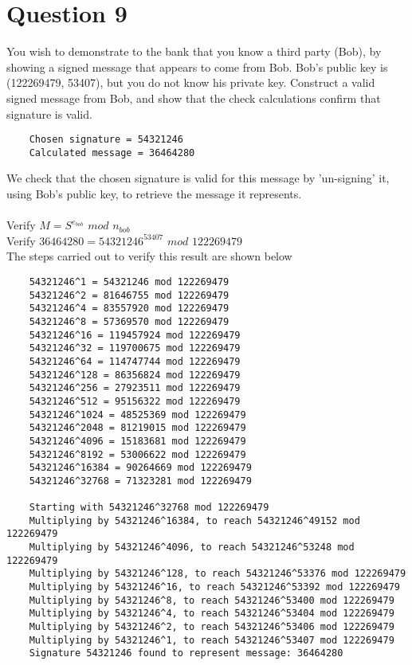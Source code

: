 \documentclass[a4paper,12pt]{article}
\begin{document}
\section*{Question 9}
You wish to demonstrate to the bank that you know a third party (Bob), by showing a signed message that appears to come from Bob. Bob’s public key is (122269479, 53407), but you do not know his private key. Construct a valid signed message from Bob, and show that the check calculations confirm that signature is valid.
\begin{verbatim}
    Chosen signature = 54321246
    Calculated message = 36464280
\end{verbatim}
We check that the chosen signature is valid for this message by 'un-signing' it, using Bob's public key, to retrieve the message it represents.\\\\
Verify $M = S^{e_{bob}}$ $mod$ $n_{bob}$\\
Verify $36464280 = 54321246^{53407}$ $mod$ $122269479$\\
The steps carried out to verify this result are shown below
\begin{verbatim}
    54321246^1 = 54321246 mod 122269479
    54321246^2 = 81646755 mod 122269479
    54321246^4 = 83557920 mod 122269479
    54321246^8 = 57369570 mod 122269479
    54321246^16 = 119457924 mod 122269479
    54321246^32 = 119700675 mod 122269479
    54321246^64 = 114747744 mod 122269479
    54321246^128 = 86356824 mod 122269479
    54321246^256 = 27923511 mod 122269479
    54321246^512 = 95156322 mod 122269479
    54321246^1024 = 48525369 mod 122269479
    54321246^2048 = 81219015 mod 122269479
    54321246^4096 = 15183681 mod 122269479
    54321246^8192 = 53006622 mod 122269479
    54321246^16384 = 90264669 mod 122269479
    54321246^32768 = 71323281 mod 122269479

    Starting with 54321246^32768 mod 122269479
    Multiplying by 54321246^16384, to reach 54321246^49152 mod 122269479
    Multiplying by 54321246^4096, to reach 54321246^53248 mod 122269479
    Multiplying by 54321246^128, to reach 54321246^53376 mod 122269479
    Multiplying by 54321246^16, to reach 54321246^53392 mod 122269479
    Multiplying by 54321246^8, to reach 54321246^53400 mod 122269479
    Multiplying by 54321246^4, to reach 54321246^53404 mod 122269479
    Multiplying by 54321246^2, to reach 54321246^53406 mod 122269479
    Multiplying by 54321246^1, to reach 54321246^53407 mod 122269479
    Signature 54321246 found to represent message: 36464280
\end{verbatim}
\end{document}
